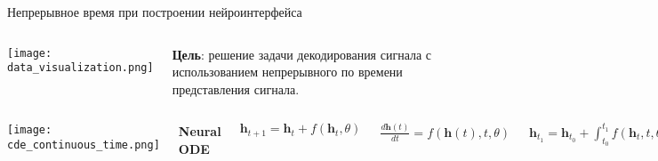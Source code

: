 \documentclass{beamer}
\begin{document}
\begin{frame}{Непрерывное время при построении нейроинтерфейса}



\begin{columns}[c]
\texttt{[image: data\_visualization.png]}

\large

\textbf{Цель}: решение задачи декодирования сигнала с использованием непрерывного по времени представления сигнала.




\end{columns}
\begin{columns}[c]
\texttt{[image: cde\_continuous\_time.png]}

\Large{\textbf{Neural ODE}}

\normalsize


$\mathbf{h}_{t+1} = \mathbf{h}_t + f(\mathbf{h}_t, \theta)$

\large

\bigskip


$\frac{d\mathbf{h}(t)}{dt} = f(\mathbf{h}(t), t, \theta)$

\normalsize

\bigskip

$\mathbf{h}_{t_1} = \mathbf{h}_{t_0} + \int_{t_0}^{t_1} f(\mathbf{h}_t, t, \theta) dt$

\end{columns}

\end{frame}
\end{document}
